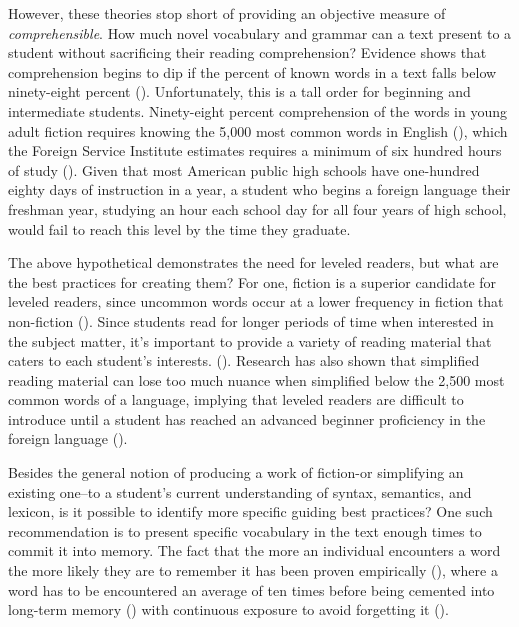 \documentclass[
	letterpaper, %
]{jdf}
\newcommand{\pcite}[1]{(\cite{#1})}
\begin{document}
However, these theories stop short of providing an objective measure of \textit{comprehensible}. How much novel vocabulary and grammar can a text present to a student without sacrificing their reading comprehension? Evidence shows that comprehension begins to dip if the percent of known words in a text falls below ninety-eight percent \pcite{hu_2000}. Unfortunately, this is a tall order for beginning and intermediate students. Ninety-eight percent comprehension of the words in young adult fiction requires knowing the 5,000 most common words in English \pcite{nation1992vocabulary}, which the Foreign Service Institute estimates requires a minimum of six hundred hours of study \pcite{fsi_language_learning}. Given that most American public high schools have one-hundred eighty days of instruction in a year, a student who begins a foreign language their freshman year, studying an hour each school day for all four years of high school, would fail to reach this level by the time they graduate.

The above hypothetical demonstrates the need for leveled readers, but what are the best practices for creating them? For one, fiction is a superior candidate for leveled readers, since uncommon words occur at a lower frequency in fiction that non-fiction \pcite{hu_2000}. Since students read for longer periods of time when interested in the subject matter, it's important to provide a variety of reading material that caters to each student's interests. \pcite{llm_augmented_exercise_retrieval}. Research has also shown that simplified reading material can lose too much nuance when simplified below the 2,500 most common words of a language, implying that leveled readers are difficult to introduce until a student has reached an advanced beginner proficiency in the foreign language \pcite{nation1992vocabulary}. 

Besides the general notion of producing a work of fiction-or simplifying an existing one–to a student's current understanding of syntax, semantics, and lexicon, is it possible to identify more specific guiding best practices? One such recommendation is to present specific vocabulary in the text enough times to commit it into memory. The fact that the more an individual encounters a word the more likely they are to remember it has been proven empirically \pcite{clockworkorange}, where a word has to be encountered an average of ten times before being cemented into long-term memory \pcite{Nation2020GradedRA} with continuous exposure to avoid forgetting it \pcite{cepedasrs}.
\end{document}

